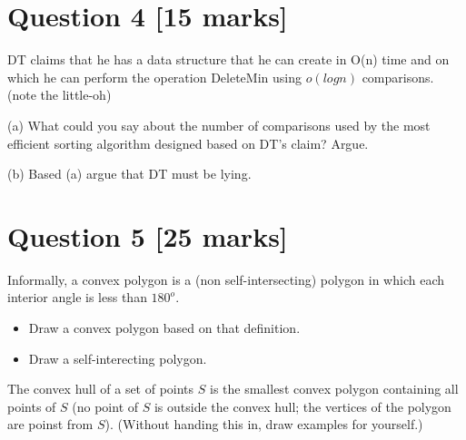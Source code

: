 \documentclass[11pt]{article}
\begin{document}
\section*{Question 4 [15 marks]}
DT claims that he has a data structure that he can create in O(n) time and on which he can perform the operation DeleteMin using $o(log n)$ comparisons. (note the little-oh)

(a) What could you say about the number of comparisons  used by the most efficient sorting algorithm designed based on DT's claim?  Argue.

(b) Based (a) argue that DT must be lying.

\section*{Question 5 [25 marks]}
Informally, a convex polygon is a (non self-intersecting) polygon in which each interior angle is less than $180^o$.  
\begin{itemize}
	\item
	Draw a convex polygon  based on that definition.
	\item
	Draw a self-interecting polygon.
\end{itemize}

The convex hull of a set of points $S$  is the smallest convex polygon containing all points of $S$ (no point of $S$ is outside the convex hull; the vertices of the polygon are poinst from $S$). (Without handing this in, draw examples for yourself.)
\end{document}
